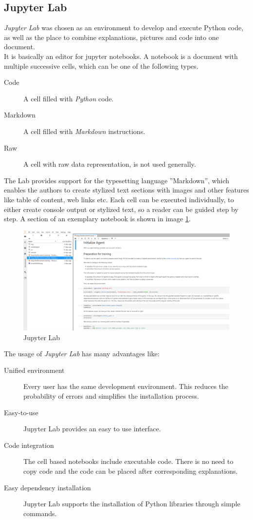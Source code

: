 \documentclass[10pt,a4paper]{article}
\begin{document}
		\subsection{Jupyter Lab}
		\textit{Jupyter Lab} was chosen as an environment to develop and execute Python code, as well as the place to combine explanations, pictures and code into one document.\\
		It is basically an editor for jupyter notebooks.
		A notebook is a document with multiple successive cells, which can be one of the following types. 	\begin{description}
			\item[Code] A cell filled with \textit{Python} code.
			\item[Markdown] A cell filled with \textit{Markdown} instructions.
			\item[Raw] A cell with raw data representation, is not used generally.
		\end{description} 
		The Lab provides support for the typesetting language ''Markdown'', which enables the authors to create stylized text sections with images and other features like table of content, web links etc.
		Each cell can be executed individually, to either create console output or stylized text, so a reader can be guided step by step.
		A section of an exemplary notebook is shown in image \ref{jupLab}.\\
			\begin{figure}[h!]
			\begin{center}
				\includegraphics[width=\linewidth]{img/jupLab.png}
				\caption{Jupyter Lab}
				\label{jupLab}
			\end{center}
		\end{figure}
		The usage of \textit{Jupyter Lab} has many advantages like:
		\begin{description}
			\item [Unified environment] Every user has the same development environment. This reduces the probability of errors and simplifies the installation process.
			\item[Easy-to-use] Jupyter Lab provides an easy to use interface.
			\item[Code integration] The cell based notebooks include executable code. There is no need to copy code and the code can be placed after corresponding explanations.
			\item[Easy dependency installation] Jupyter Lab supports the installation of Python libraries through simple commands.
		\end{description}
\end{document}
